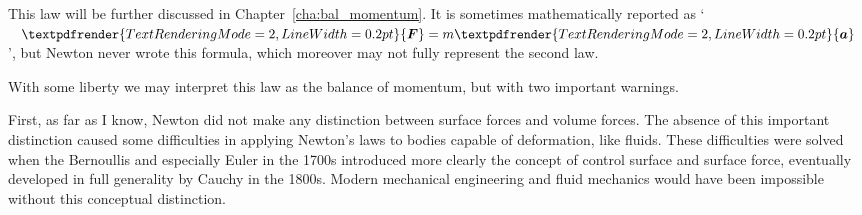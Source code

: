 \documentclass[a4paper,12pt,%
onecolumn,oneside,%
british%
]{memoir}
\renewcommand*{\bm}[1]{\textpdfrender{TextRenderingMode=2,LineWidth=0.2pt}{\boldsymbol{#1}}}
\renewcommand*{\|}[1][]{\nonscript\:#1\vert\nonscript\:\mathopen{}}
\newcommand*{\chap}{Chapter}%
\begin{document}
This law will be further discussed in \chap~\ref{cha:bal_momentum}. It is sometimes mathematically reported as \enquote*{$\bm{F} = m \bm{a}$}, but Newton never wrote this formula, which moreover may not fully represent the second law.

With some liberty we may interpret this law as the balance of momentum, but with two important warnings.

First, as far as I know, Newton did not make any distinction between surface forces and volume forces. The absence of this important distinction caused some difficulties in applying Newton's laws to bodies capable of deformation, like fluids. These difficulties were solved when the Bernoullis and especially Euler in the 1700s introduced more clearly the concept of control surface and surface force, eventually developed in full generality by Cauchy in the 1800s. Modern mechanical engineering and fluid mechanics would have been impossible without this conceptual distinction.
%
%
\end{document}
